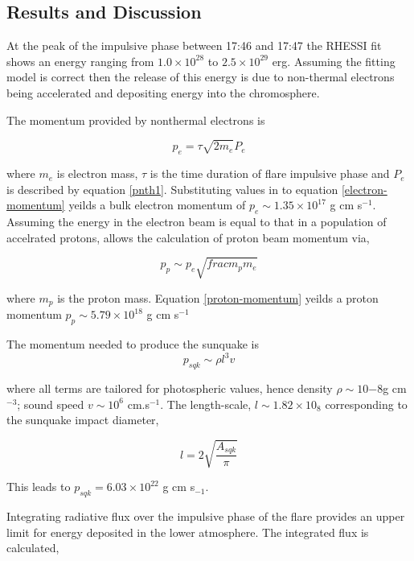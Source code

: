 \subsection{Results and Discussion}
At the peak of the impulsive phase between 17:46 and 17:47 the RHESSI fit shows an energy ranging from $1.0{\times}10^{28}$ to $2.5{\times}10^{29}$ erg. Assuming the fitting model is correct then the release of this energy is due to non-thermal electrons being accelerated and depositing energy into the chromosphere. 

The momentum provided by nonthermal electrons is

\begin{equation}\label{electron-momentum}
p_e=\tau \sqrt{2m_e} P_{e}
\end{equation}

where $m_e$ is electron mass, $\tau$ is the time duration of flare impulsive phase and $P_{e}$ is described by equation \ref{pnth1}. Substituting values in to equation \ref{electron-momentum} yeilds a bulk electron momentum of $p_e \sim 1.35{\times}10^{17}$ g cm s$^{-1}$. Assuming the energy in the electron beam is equal to that in a population of accelrated protons, allows the calculation of proton beam momentum via, 

\begin{equation}\label{proton-momentum}
p_p \sim p_e \sqrt{frac{m_p}{m_e}}
\end{equation}

where $m_p$ is the proton mass. Equation \ref{proton-momentum} yeilds a proton momentum $p_p \sim 5.79{\times}10^18$ g cm s$^{-1}$


The momentum needed to produce the sunquake is
\begin{equation}
p_{sqk}\sim \rho l^{3} v
\end{equation} 

where all terms are tailored for photospheric values, hence density $\rho \sim 10{-8}$g cm$^{-3}$; sound speed $v \sim 10^{6}$ cm.s$^{-1}$. The length-scale, $l \sim  1.82{\times}10_{8}$ corresponding to the sunquake impact diameter, 

\begin{equation}
l = 2\sqrt{\frac{A_{sqk}}{\pi}}
\end{equation}

This leads to $p_{sqk} = 6.03{\times}10^{22}$ g cm s$_{-1}$.

Integrating radiative flux over the impulsive phase of the flare provides an upper limit for energy deposited in the lower atmosphere. The integrated flux is calculated,

